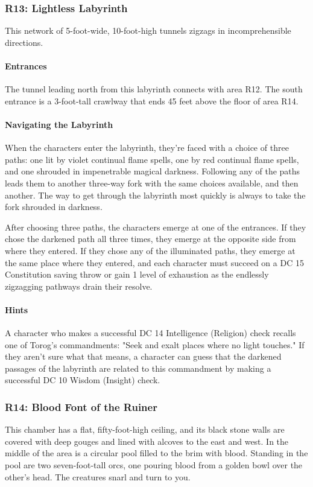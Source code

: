 \documentclass[10pt,a4paper,twoside,twocolumn,openany,nodeprecatedcode]{dndbook}
\begin{document}
\subsubsection{R13: Lightless Labyrinth}
This network of 5-foot-wide, 10-foot-high tunnels zigzags in incomprehensible directions.

\paragraph{Entrances}
The tunnel leading north from this labyrinth connects with area R12. The south entrance is a 3-foot-tall crawlway that ends 45 feet above the floor of area R14.

\paragraph{Navigating the Labyrinth}
When the characters enter the labyrinth, they're faced with a choice of three paths: one lit by violet continual flame spells, one by red continual flame spells, and one shrouded in impenetrable magical darkness. Following any of the paths leads them to another three-way fork with the same choices available, and then another. The way to get through the labyrinth most quickly is always to take the fork shrouded in darkness.

After choosing three paths, the characters emerge at one of the entrances. If they chose the darkened path all three times, they emerge at the opposite side from where they entered. If they chose any of the illuminated paths, they emerge at the same place where they entered, and each character must succeed on a DC 15 Constitution saving throw or gain 1 level of exhaustion as the endlessly zigzagging pathways drain their resolve.

\paragraph{Hints}
A character who makes a successful DC 14 Intelligence (Religion) check recalls one of Torog's commandments: "Seek and exalt places where no light touches." If they aren't sure what that means, a character can guess that the darkened passages of the labyrinth are related to this commandment by making a successful DC 10 Wisdom (Insight) check.

\subsubsection{R14: Blood Font of the Ruiner}
\begin{DndReadAloud}{}
This chamber has a flat, fifty-foot-high ceiling, and its black stone walls are covered with deep gouges and lined with alcoves to the east and west. In the middle of the area is a circular pool filled to the brim with blood. Standing in the pool are two seven-foot-tall orcs, one pouring blood from a golden bowl over the other's head. The creatures snarl and turn to you.

\end{DndReadAloud}
\end{document}
